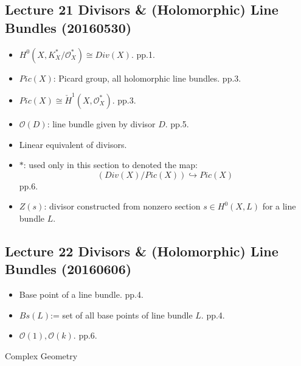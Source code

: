 \documentclass{article}
\numberwithin{equation}{subsection} %
\begin{document}
	\subsection{Lecture 21 Divisors \& (Holomorphic) Line Bundles  (20160530)}
	\begin{itemize}
		\item $H^0(X,K^*_X/\mathcal{O}^*_X) \cong Div(X)$. pp.1.
		\item $Pic(X)$: Picard group, all holomorphic line bundles. pp.3.
		\item $Pic(X) \cong \check{H}^1(X,\mathcal{O}^*_X)$. pp.3.
		\item $\mathcal{O}(D)$: line bundle given by divisor $D$. pp.5.
		\item Linear equivalent of divisors.
		\item $*$: used only in this section to denoted the map:
		$$\left( Div(X)/Pic(X) \right) \hookrightarrow Pic(X)$$
		pp.6.
		\item $Z(s)$: divisor constructed from nonzero section $s\in H^0(X,L)$ for a line bundle $L$.
	\end{itemize}
	
	\subsection{Lecture 22 Divisors \& (Holomorphic) Line Bundles (20160606)}
	\begin{itemize}
		\item Base point of a line bundle. pp.4.
		\item $Bs(L)$:= set of all base points of line bundle $L$. pp.4.
		\item $\mathcal{O}(1), \mathcal{O}(k)$. pp.6.
	\end{itemize}

\begin{thebibliography}{1}
	
	
	 Complex Geometry
	
	
\end{thebibliography}
\end{document}
